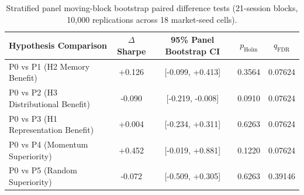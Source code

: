 \begin{table}[ht]
\centering
\small
\begin{tabular}{lcccc}
\toprule
\textbf{Hypothesis Comparison} & \textbf{$\Delta$Sharpe} & \textbf{95\% Panel Bootstrap CI} & \textbf{$p_{\text{Holm}}$} & \textbf{$q_{\text{FDR}}$} \\
\midrule
P0 vs P1 (H2 Memory Benefit) & +0.126 & [-0.099, +0.413] & 0.3564 & 0.07624 \\
P0 vs P2 (H3 Distributional Benefit) & -0.090 & [-0.219, -0.008] & 0.0910 & 0.07624 \\
P0 vs P3 (H1 Representation Benefit) & +0.004 & [-0.234, +0.311] & 0.6263 & 0.07624 \\
P0 vs P4 (Momentum Superiority) & +0.452 & [-0.019, +0.881] & 0.1220 & 0.07624 \\
P0 vs P5 (Random Superiority) & -0.072 & [-0.509, +0.305] & 0.6263 & 0.39146 \\
\bottomrule
\end{tabular}
\caption{Stratified panel moving-block bootstrap paired difference tests (21-session blocks, 10,000 replications across 18 market-seed cells).}
\label{tab:statistical_bootstrap}
\end{table}
